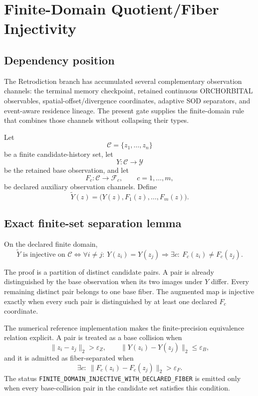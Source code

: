\chapter{Finite-Domain Quotient/Fiber Injectivity}
\label{chap:quotient-fiber-finite-injectivity}

\section{Dependency position}

The Retrodiction branch has accumulated several complementary observation channels: the terminal memory checkpoint, retained continuous ORCHORBITAL observables, spatial-offset/divergence coordinates, adaptive SOD separators, and event-aware residence lineage.  The present gate supplies the finite-domain rule that combines those channels without collapsing their types.

Let
\[
\mathcal C=\{z_1,\ldots,z_n\}
\]
be a finite candidate-history set, let
\[
Y:\mathcal C\to\mathcal Y
\]
be the retained base observation, and let
\[
F_c:\mathcal C\to\mathcal F_c,
\qquad c=1,\ldots,m,
\]
be declared auxiliary observation channels.  Define
\[
\widetilde Y(z)
=\bigl(Y(z),F_1(z),\ldots,F_m(z)\bigr).
\]

\section{Exact finite-set separation lemma}

On the declared finite domain,
\[
\boxed{
\widetilde Y\text{ is injective on }\mathcal C
\iff
\forall i\ne j:\
Y(z_i)=Y(z_j)
\Longrightarrow
\exists c:\ F_c(z_i)\ne F_c(z_j).
}
\]

The proof is a partition of distinct candidate pairs.  A pair is already distinguished by the base observation when its two images under $Y$ differ.  Every remaining distinct pair belongs to one base fiber.  The augmented map is injective exactly when every such pair is distinguished by at least one declared $F_c$ coordinate.

The numerical reference implementation makes the finite-precision equivalence relation explicit.  A pair is treated as a base collision when
\[
\|z_i-z_j\|_2>\varepsilon_Z,
\qquad
\|Y(z_i)-Y(z_j)\|_2\le\varepsilon_B,
\]
and it is admitted as fiber-separated when
\[
\exists c:\
\|F_c(z_i)-F_c(z_j)\|_2>\varepsilon_F.
\]
The status
\texttt{FINITE\_DOMAIN\_INJECTIVE\_WITH\_DECLARED\_FIBER}
is emitted only when every base-collision pair in the candidate set satisfies this condition.


